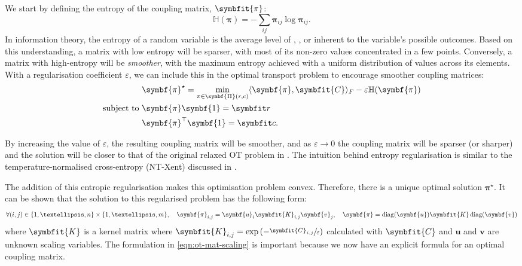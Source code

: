 We start by defining the entropy of the coupling matrix, $\symbfit{\pi}$:
\begin{equation}
    \mathbb{H}(\symbf{\pi}) = -\sum_{ij}\symbf{\pi}_{ij}\log\symbf{\pi}_{ij}.
\end{equation}
In information theory, the entropy of a random variable is the average level of , , or  inherent to the variable's possible outcomes. Based on this understanding, a matrix with low entropy will be sparser, with most of its non-zero values concentrated in a few points. Conversely, a matrix with high-entropy will be \textit{smoother}, with the maximum entropy achieved with a uniform distribution of values across its elements. With a regularisation coefficient $\varepsilon$, we can include this in the optimal transport problem to encourage smoother coupling matrices:
\begin{align}
& \symbf{\pi}^\star = \min_{\pi \in \symbf{\Pi}(r, c)}\langle\symbf{\pi},\symbfit{C}\rangle_{F} -\varepsilon \mathbb{H}(\symbf{\pi})\\
\text{subject to } &\symbf{\pi}\symbf{1} = \bfitr \nonumber\\
&\symbf{\pi}^{\top}\symbf{1} = \bfitc. \nonumber
\end{align}

By increasing the value of $\varepsilon$, the resulting coupling matrix will be smoother, and as $\varepsilon \rightarrow 0$ the coupling matrix will be sparser (or sharper) and the solution will be closer to that of the original relaxed OT problem in . The intuition behind entropy regularisation is similar to the temperature-normalised cross-entropy (NT-Xent) discussed in .

The addition of this entropic regularisation makes this optimisation problem convex. Therefore, there is a unique optimal solution $\symbf{\pi}^\star$. It can be shown that the solution to this regularised problem has the following form:
\begin{equation}
    \forall (i,j) \in \{1,…,n\}\times \{1, …, m\},\quad \symbf{\pi}_{i,j} = \symbf{u}_i \symbfit{K}_{i,j} \symbf{v}_j, \quad \symbf{\pi} = \operatorname{diag}(\symbf{u}) \symbfit{K} \operatorname{diag}(\symbf{v})
    \label{eqn:ot-mat-scaling}
\end{equation}
where $\symbfit{K}$ is a kernel matrix where $\symbfit{K}_{i,j}=\exp{(-\sfrac{\symbfit{C}_{i,j}}{\varepsilon})}$ calculated with $\symbfit{C}$ and $\symbf{u}$ and $\symbf{v}$ are unknown scaling variables. The formulation in \cref{eqn:ot-mat-scaling} is important because we now have an explicit formula for an optimal coupling matrix.

